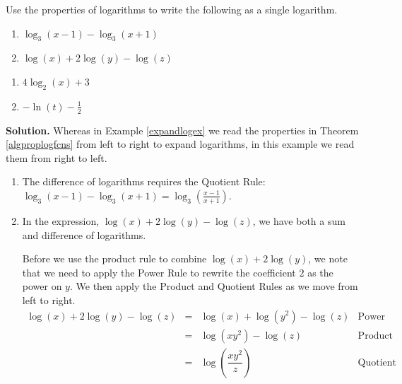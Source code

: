 \documentclass{ximera}
\begin{document}
\begin{ex}  \label{contractlogex} Use the properties of logarithms to write the following as a single logarithm.

\begin{multicols}{2}
\begin{enumerate}

\item  $\log_{3}(x-1) - \log_{3}(x+1)$

\item  $\log(x) + 2\log(y) - \log(z)$

\setcounter{HW}{\value{enumi}}
\end{enumerate}
\end{multicols}

\begin{multicols}{2}
\begin{enumerate}
\setcounter{enumi}{\value{HW}}

\item  $4\log_{2}(x) + 3$

\item  $-\ln(t) - \frac{1}{2}$


\end{enumerate}
\end{multicols}

{\bf Solution.} Whereas in Example \ref{expandlogex} we read the properties in Theorem \ref{algproplogfcns} from left to right to expand logarithms, in this example we read them from right to left.

\begin{enumerate}

\item The difference of logarithms requires the Quotient Rule: $\log_{3}(x-1) - \log_{3}(x+1) = \log_{3}\left(\frac{x-1}{x+1}\right)$.

\item  In the expression, $\log(x) + 2\log(y) - \log(z)$, we have both a sum and difference of logarithms.  

Before we use the product rule to combine $\log(x) + 2\log(y)$, we note that we need to apply the Power Rule to rewrite the coefficient $2$ as the power on $y$.  We  then apply the Product and Quotient Rules as we move from left to right.
\setlength{\extrarowheight}{6pt}
\[ \begin{array}{rclr}

\log(x) + 2\log(y) - \log(z) & = & \log(x) + \log\left(y^2\right) - \log(z) & \mbox{Power Rule} \\ [6pt]
                             & = & \log\left(xy^2\right) - \log(z) & \mbox{Product Rule} \\ [10pt]
                             & = & \log\left( \dfrac{xy^2}{z}\right) & \mbox{Quotient Rule} \\
                             

\end{array}\]
\end{enumerate}
\end{ex}
\end{document}
